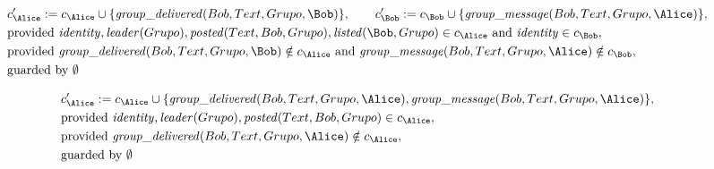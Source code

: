 \begin{align*}
&
c'_
{
\Alice
}
 := 
c_
{
\Alice
}
 \cup 
\{
\mathit{\detokenize{
group_delivered
}}
(
Bob
,
Text
,
Grupo
,
\Bob
)
\}
, \qquad 
c'_
{
\Bob
}
 := 
c_
{
\Bob
}
 \cup 
\{
\mathit{\detokenize{
group_message
}}
(
Bob
,
Text
,
Grupo
,
\Alice
)
\}
,\\
&
\text{provided } 
\mathit{\detokenize{
identity
}}
,
\mathit{\detokenize{
leader
}}
(
Grupo
)
,
\mathit{\detokenize{
posted
}}
(
Text
,
Bob
,
Grupo
)
,
\mathit{\detokenize{
listed
}}
(
\Bob
,
Grupo
)
 \in c_
{
\Alice
}
 \text{ and } 
\mathit{\detokenize{
identity
}}
 \in c_
{
\Bob
}
,\\
&
\text{provided } 
\mathit{\detokenize{
group_delivered
}}
(
Bob
,
Text
,
Grupo
,
\Bob
)
 \notin c_
{
\Alice
}
 \text{ and } 
\mathit{\detokenize{
group_message
}}
(
Bob
,
Text
,
Grupo
,
\Alice
)
 \notin c_
{
\Bob
}
,\\
&
\text{guarded by } \emptyset
\end{align*}

\begin{align*}
&
c'_
{
\Alice
}
 := 
c_
{
\Alice
}
 \cup 
\{
\mathit{\detokenize{
group_delivered
}}
(
Bob
,
Text
,
Grupo
,
\Alice
)
,
\mathit{\detokenize{
group_message
}}
(
Bob
,
Text
,
Grupo
,
\Alice
)
\}
,\\
&
\text{provided } 
\mathit{\detokenize{
identity
}}
,
\mathit{\detokenize{
leader
}}
(
Grupo
)
,
\mathit{\detokenize{
posted
}}
(
Text
,
Bob
,
Grupo
)
 \in c_
{
\Alice
}
,\\
&
\text{provided } 
\mathit{\detokenize{
group_delivered
}}
(
Bob
,
Text
,
Grupo
,
\Alice
)
 \notin c_
{
\Alice
}
,\\
&
\text{guarded by } \emptyset
\end{align*}
